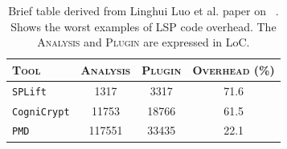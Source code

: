 \documentclass[sigplan,10pt]{acmart}
\begin{document}
\begin{table}[h!]
\begin{tabularx}{\columnwidth}{bccc}
\toprule
\textsc{Tool} & \textsc{Analysis} & \textsc{Plugin} & \textsc{Overhead} (\%)\\ 
\midrule
 \texttt{SPLift} & 1317 & 3317 & 71.6\\
 \texttt{CogniCrypt} & 11753 & 18766 & 61.5\\
  \texttt{PMD} & 117551 & 33435 & 22.1\\
\bottomrule
\end{tabularx}
 \caption{Brief table derived from Linghui Luo et al. paper on \magpie~\cite{magpie}. Shows the worst examples of LSP code overhead. The \textsc{Analysis} and \textsc{Plugin} are expressed in LoC.} 
 \label{lsp_overhead}
\end{table}
\end{document}
